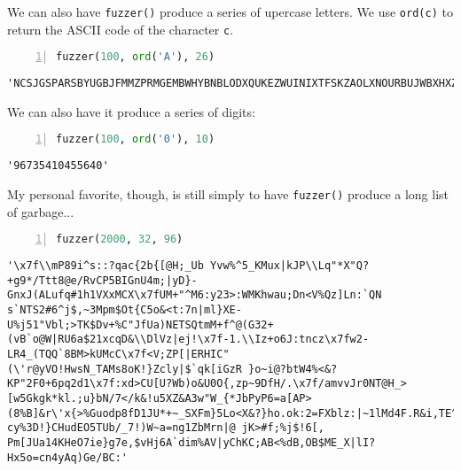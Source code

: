 \documentclass[10pt,parskip=half,
	toc=sectionentrywithdots,
	bibliography=totocnumbered,
	captions=tableheading,numbers=noendperiod]{scrartcl}
\begin{document}
We can also have \texttt{fuzzer()} produce a series of upercase letters.
We use \texttt{ord(c)} to return the ASCII code of the character
\texttt{c}.

\begin{lstlisting}[language=Python,numbers=left,xleftmargin=20pt,xrightmargin=5pt,belowskip=5pt,aboveskip=5pt]
fuzzer(100, ord('A'), 26)
\end{lstlisting}

\begin{lstlisting}[language={},postbreak={},numbers=none,xrightmargin=7pt,breakindent=0pt,aboveskip=5pt,belowskip=5pt]
'NCSJGSPARSBYUGBJFMMZPRMGEMBWHYBNBLODXQUKEZWUINIXTFSKZAOLXNOURBUJWBXHXZBNYHNGHGYIUYBNUSSFJGY'
\end{lstlisting}

We can also have it produce a series of digits:

\begin{lstlisting}[language=Python,numbers=left,xleftmargin=20pt,xrightmargin=5pt,belowskip=5pt,aboveskip=5pt]
fuzzer(100, ord('0'), 10)
\end{lstlisting}

\begin{lstlisting}[language={},postbreak={},numbers=none,xrightmargin=7pt,breakindent=0pt,aboveskip=5pt,belowskip=5pt]
'96735410455640'
\end{lstlisting}

My personal favorite, though, is still simply to have \texttt{fuzzer()}
produce a long list of garbage...

\begin{lstlisting}[language=Python,numbers=left,xleftmargin=20pt,xrightmargin=5pt,belowskip=5pt,aboveskip=5pt]
fuzzer(2000, 32, 96)
\end{lstlisting}

\begin{lstlisting}[language={},postbreak={},numbers=none,xrightmargin=7pt,breakindent=0pt,aboveskip=5pt,belowskip=5pt]
'\x7f\\mP89i^s::?qac{2b{[@H;_Ub Yvw%^5_KMux|kJP\\Lq"*X"Q?+g9*/Ttt8@e/RvCP5BIGnU4m;|yD}-GnxJ(ALufq#1h1VXxMCX\x7fUM+"^M6:y23>:WMKhwau;Dn<V%Qz]Ln:`QN s`NTS2#6^j$,~3Mpm$Ot{C5o&<t:7n|ml}XE-U%j51"Vbl;>TK$Dv+%C"JfUa)NETSQtmM+f^@(G32+(vB`o@W|RU6a$21xcqD&\\DlVz|ej!\x7f-1.\\Iz+o6J:tncz\x7fw2-LR4_(TQQ`8BM>kUMcC\x7f<V;ZP[|ERHIC"(\'r@yVO!HwsN_TAMs8oK!}Zcly|$`qk[iGzR }o~i@?btW4%<&?KP"2F0+6pq2d1\x7f:xd>CU[U?Wb)o&U0O{,zp~9DfH/.\x7f/amvvJr0NT@H_>[w5Gkgk*kl.;u}bN/7</k&!u5XZ&A3w"W_{*JbPyP6=a[AP>(8%B]&r\'x{>%Guodp8fD1JU*+~_SXFm}5Lo<X&?}ho.ok:2=FXblz:|~1lMd4F.R&i,TE^-cy%3D!}CHudEO5TUb/_7!)W~a=ng1ZbMrn|@ jK>#f;%j$!6[, Pm[JUa14KHeO7ie}g7e,$vHj6A`dim%AV|yChKC;AB<%dB,OB$ME_X|lI?Hx5o=cn4yAq)Ge/BC:'
\end{lstlisting}
\end{document}
